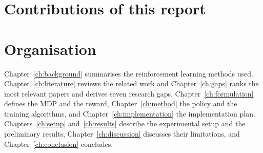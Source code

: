 \section{Contributions of this report}



\section{Organisation}

Chapter~\ref{ch:background} summarises the reinforcement learning methods used. Chapter~\ref{ch:literature} reviews the related work and Chapter~\ref{ch:gaps} ranks the most relevant papers and derives seven research gaps. Chapter~\ref{ch:formulation} defines the MDP and the reward, Chapter~\ref{ch:method} the policy and the training algorithms, and Chapter~\ref{ch:implementation} the implementation plan. Chapters~\ref{ch:setup} and~\ref{ch:results} describe the experimental setup and the preliminary results, Chapter~\ref{ch:discussion} discusses their limitations, and Chapter~\ref{ch:conclusion} concludes.
